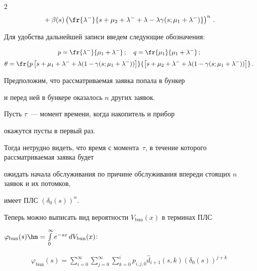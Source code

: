 \begin{multicols}{2}
\begin{multline*}
{}+\beta (s)\left (


\fr{\lambda^-}{s+\mu_2+\lambda^- + \lambda - \lambda \gamma(s; \mu_1 + \lambda^-)}


\right )^{n}\,.


\end{multline*}





Для удобства дальнейшей записи введем следующие обозначения:


\begin{gather*}


p=\fr{\lambda^-}{\mu_1 + \lambda^-}\,; \quad q = \fr{\mu_1}{\mu_1 + \lambda^-}\,;\\[2pt]


\theta = \fr{p \left[s + \mu_1 + \lambda^- + \lambda (1 - \gamma(s;\mu_1 + \lambda^-))\right] }{


\left[s + \mu_2 + \lambda^- + \lambda (1 - \gamma(s;\mu_1 + \lambda^-))\right]}\,.


\end{gather*}





Предположим, что рассматриваемая заявка попала в бункер


и перед ней в бункере оказалось $n$ других заявок.


Пусть $\tau$~--- момент времени, когда накопитель и прибор


окажутся пусты в первый раз.


Тогда нетрудно видеть, что время с момента~$\tau$, в течение которого рассматриваемая заявка будет


ожидать начала обслуживания по причине обслуживания впереди стоящих $n$ заявок и их потомков,


имеет ПЛС $(\delta_0(s))^n$.





Теперь можно выписать вид вероятности $V_{\mathrm{bun}}(x)$ в терминах ПЛС


$\varphi_{\mathrm{bun}}(s)\hm= \int\limits_0^{\infty} e^{-sx}\,dV_{\mathrm{bun}}(x)$:


\begin{multline*}


\varphi_{\mathrm{bun}}(s) = \sum\limits_{i=0}^\infty


\sum\limits_{j=0}^\infty \sum\limits_{k=0}^{i}


p_{i,j,0} \hat d_{i+1}(s,k) (\delta_0(s))^{j+k}



\end{multline*}
\end{multicols}
